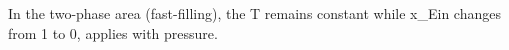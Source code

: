 In the two-phase area (fast-filling), the T remains constant while x_Ein changes from 1 to 0, applies with pressure.